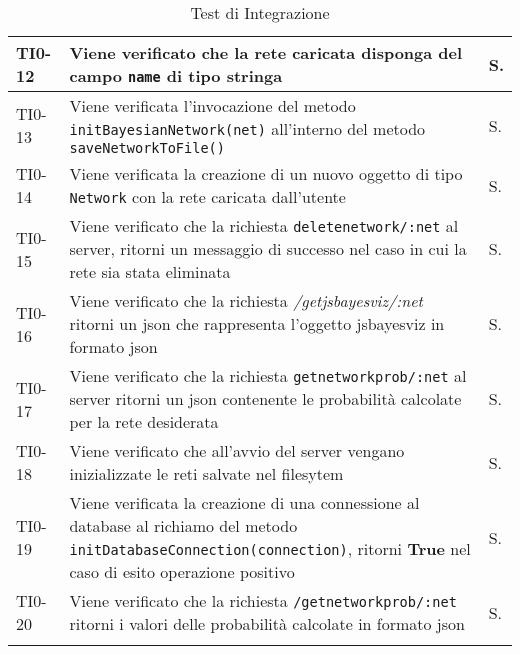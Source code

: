 \begin{longtable}{|C{.15\textwidth}|m{.52\textwidth}|m{.08\textwidth}|}
\hline
{}TI0-12 & Viene verificato che la rete caricata disponga del campo \texttt{name} di tipo \textbf{stringa} & S. \\ 
\hline
TI0-13 & Viene verificata l'invocazione del metodo \texttt{initBayesianNetwork(net)} all'interno del metodo \texttt{saveNetworkToFile()} & S. \\ 
\hline
{}TI0-14 & Viene verificata la creazione di un nuovo oggetto di tipo \texttt{Network} con la rete caricata dall'utente & S. \\ 
\hline
TI0-15 & Viene verificato che la richiesta \texttt{deletenetwork/:net} al server, ritorni un messaggio di successo nel caso in cui la rete sia stata eliminata & S. \\
\hline
{}TI0-16 & Viene verificato che la richiesta \textit{/getjsbayesviz/:net} ritorni un json che rappresenta l'oggetto jsbayesviz in formato json & S.\\
\hline
TI0-17 & Viene verificato che la richiesta \texttt{getnetworkprob/:net} al server ritorni un json contenente le probabilità calcolate per la rete desiderata & S. \\ 
\hline 
{}TI0-18 & Viene verificato che all'avvio del server vengano inizializzate le reti salvate nel filesytem & S. \\ 
\hline
TI0-19 &  Viene verificata la creazione di una connessione al database al richiamo del metodo \texttt{initDatabaseConnection(connection)}, ritorni \textbf{True} nel caso di esito operazione positivo & S.\\ 
\hline
{}TI0-20 & Viene verificato che la richiesta \texttt{/getnetworkprob/:net} ritorni i valori delle probabilità calcolate in formato json & S. \\ 
\hline

\caption{Test di Integrazione}
\label{testintegrazione}
\end{longtable}